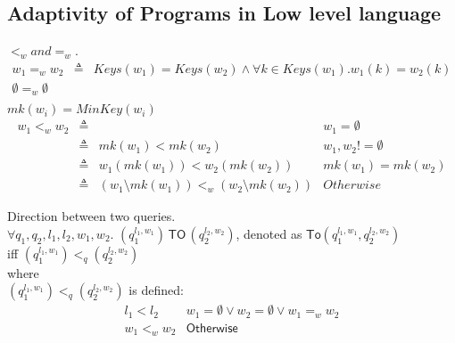 \documentclass[a4paper,11pt]{article}
\begin{document}
\subsection{Adaptivity of Programs in Low level language}
%
%
\begin{defn}
$<_w and =_w$.\\
\[
  \begin{array}{lll}
     w_1 =_w w_2  &  \triangleq &  Keys(w_1) = Keys(w_2) \land \forall k \in Keys(w_1). w_1(k) = w_2(k) \\
     \emptyset =_w \emptyset & &   \\
  \end{array}
\] 
$mk(w_i) =MinKey(w_i) $ 
\[
\begin{array}{lllr}
     w_1 <_w w_2 & \triangleq & & w_1 = \emptyset \\
     & \triangleq  & mk(w_1) < mk(w_2) & w_1,w_2 != \emptyset  \\
     & \triangleq & w_1(mk(w_1)) < w_2(mk(w_2))   & mk(w_1) = mk(w_2) \\
     & \triangleq & (w_1 \setminus mk(w_1) ) <_w (w_2 \setminus mk(w_2)) & Otherwise
\end{array}
\]
\end{defn}
%
\begin{defn}
Direction between two queries.
\\
$\forall q_1,q_2, l_1, l_2, w_1, w_2 $.
$(q_1^{l_1, w_1}) \, \mathsf{TO} \, (q_2^{l_2,w_2})$,
denoted as $\mathsf{To}(q_1^{l_1, w_1}, q_2^{l_2,w_2})$ \\ iff $(q_1^{l_1, w_1}) <_q (q_2^{l_2, w_2})  $\\
where \\
$(q_1^{l_1, w_1}) <_q (q_2^{l_2, w_2})$ is defined:\\
\[
\begin{array}{ll}
    l_1 < l_2  & w_1=\emptyset \lor w_2 = \emptyset \lor w_1 =_w w_2   \\
    w_1 <_w w_2    & \mathsf{Otherwise}
\end{array}  
\]
\end{defn}
%
\end{document}
